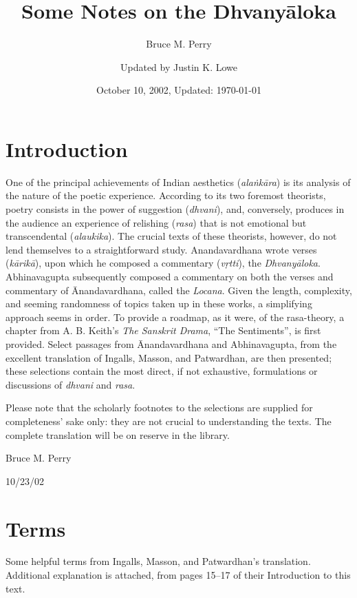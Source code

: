 \documentclass[12pt]{article}
\title{Some Notes on the Dhvanyāloka}
\author{Bruce M. Perry \and Updated by Justin K. Lowe}
\date{October 10, 2002, Updated: \today}
\begin{document}
\maketitle

\section{Introduction}

One of the principal achievements of Indian aesthetics (\textit{alaṅkāra}) is its analysis of the nature of the poetic experience.
According to its two foremost theorists, poetry consists in the power of suggestion (\textit{dhvani}), and, conversely, produces in the audience an experience of relishing (\textit{rasa}) that is not emotional but transcendental (\textit{alaukika}).
The crucial texts of these theorists, however, do not lend themselves to a straightforward study.
Anandavardhana wrote verses (\textit{kārikā}), upon which he composed a commentary (\textit{vṛtti}), the \textit{Dhvanyāloka}.
Abhinavagupta subsequently composed a commentary on both the verses and commentary of Ānandavardhana, called the \textit{Locana}.
Given the length, complexity, and seeming randomness of topics taken up in these works, a simplifying approach seems in order.
To provide a roadmap, as it were, of the rasa-theory, a chapter from A. B. Keith's \textit{The Sanskrit Drama}, ``The Sentiments'', is first provided.
Select passages from Ānandavardhana and Abhinavagupta, from the excellent translation of Ingalls, Masson, and Patwardhan, are then presented; these selections contain the most direct, if not exhaustive, formulations or discussions of \textit{dhvani} and \textit{rasa}.

Please note that the scholarly footnotes to the selections are supplied for completeness' sake only: they are not crucial to understanding the texts.
The complete translation will be on reserve in the library.


Bruce M. Perry

10/23/02

\newpage


\section{Terms}

Some helpful terms from Ingalls, Masson, and Patwardhan's translation. Additional explanation is attached, from pages 15--17 of their Introduction to this text.
\end{document}
